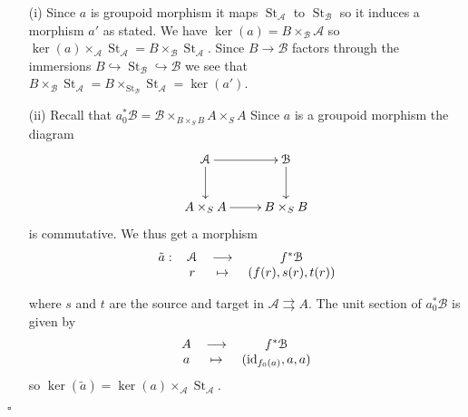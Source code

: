 \documentclass{amsart}
\newenvironment{demo}{{\flushleft \bf Proof~:}}{\hfill $\square$ \vspace{5mm}}
\theoremstyle{definition}
\theoremstyle{remark}
\begin{document}
\begin{demo}

\begin{itemize}

\item[(i)] Since $a$ is groupoid morphism it maps $\operatorname{St}_{{\mathcal A}}$ to $\operatorname{St}_{{\mathcal B}}$ so it induces a morphism $a'$ as stated. We have $\ker(a) = B \times_{{\mathcal B}} {{\mathcal A}}$ so $\ker(a) \times_{{\mathcal A}} \operatorname{St}_{{\mathcal A}} = B \times_{{\mathcal B}} \operatorname{St}_{{\mathcal A}}$. Since $B {\longrightarrow} {{\mathcal B}}$ factors through the immersions $B {\hookrightarrow} \operatorname{St}_{{\mathcal B}} {\hookrightarrow} {{\mathcal B}}$ we see that $B \times_{{\mathcal B}} \operatorname{St}_{{\mathcal A}} = B \times_{\operatorname{St}_{{\mathcal B}}} \operatorname{St}_{{\mathcal A}} = \ker(a')$.

\item[(ii)] Recall that $a_0^*{{\mathcal B}} = {{\mathcal B}} \times_{B \times_S B} A \times_S A$  Since $a$ is a groupoid morphism the diagram \[\xymatrix{{{\mathcal A}} \ar[r] \ar[d] & {{\mathcal B}} \ar[d] \\ A \times_S A \ar[r] & B \times_S B } \] is commutative. We thus get a morphism   
 \[
\begin{tabular}{cccc}
 
$\tilde{a} : $ & ${{\mathcal A}}$ & ${\longrightarrow}$ & $f^* {{\mathcal B}}$ \\ 
 
& $r$ & $\mapsto$ & $(f(r),s(r),t(r))$ \\ 
 
\end{tabular} \]

where $s$ and $t$ are the source and target in ${{\mathcal A}} {\rightrightarrows} A$. The unit section of $a_0^* {{\mathcal B}}$ is given by 
\[ \begin{tabular}{ccc}
$A$ & ${\longrightarrow}$ & $f^* {{\mathcal B}}$ \\ 

$a$ & $\mapsto$ & $(\operatorname{id}_{f_0(a)}, a,a)$ \\ 

\end{tabular} \]
so $\ker(\tilde{a})= \ker (a) \times_{{\mathcal A}} \operatorname{St}_{{\mathcal A}}$.
\end{itemize}
\end{demo}
\end{document}
